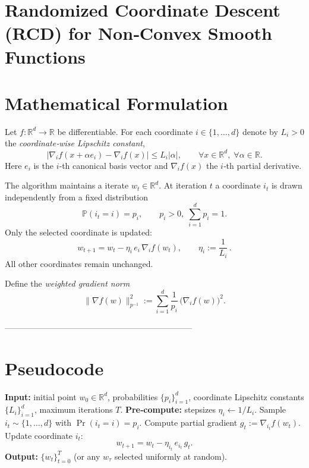 \documentclass{article}
\newcommand{\R}{\mathbb{R}}
\begin{document}
\section*{Randomized Coordinate Descent (RCD) for Non‑Convex Smooth Functions}

\section*{Mathematical Formulation}
Let $f:\R^{d}\rightarrow\R$ be differentiable.  
For each coordinate $i\in\{1,\dots,d\}$ denote by $L_i>0$ the \emph{coordinate‑wise Lipschitz constant},
\[
\big| \nabla_i f(x+ \alpha e_i)-\nabla_i f(x) \big|\le L_i|\alpha|,
\qquad\forall x\in\R^d,\;\forall\alpha\in\R .
\tag{1}
\]
Here $e_i$ is the $i$‑th canonical basis vector and $\nabla_i f(x)$ the $i$‑th partial derivative.

The algorithm maintains a iterate $w_t\in\R^d$.
At iteration $t$ a coordinate $i_t$ is drawn independently from a fixed distribution
\[
\mathbb{P}(i_t=i)=p_i,\qquad p_i>0,\;\sum_{i=1}^{d}p_i=1 .
\tag{2}
\]
Only the selected coordinate is updated:
\[
w_{t+1}=w_t-\eta_i\,e_i\,\nabla_i f(w_t),\qquad 
\eta_i:=\frac{1}{L_i}\, .
\tag{3}
\]
All other coordinates remain unchanged.  

Define the \emph{weighted gradient norm}
\[
\| \nabla f(w)\|_{p^{-1}}^2:=\sum_{i=1}^{d}\frac{1}{p_i}\,\big(\nabla_i f(w)\big)^2 .
\tag{4}
\]

--------------------------------------------------------------------

\section*{Pseudocode}
\begin{algorithm}[H]
\caption{Randomized Coordinate Descent (RCD)}
\begin{algorithmic}[1]
\State \textbf{Input:} initial point $w_0\in\R^{d}$, probabilities $\{p_i\}_{i=1}^{d}$, coordinate Lipschitz constants $\{L_i\}_{i=1}^{d}$, maximum iterations $T$.
\State \textbf{Pre‑compute:} stepsizes $\eta_i\gets 1/L_i$.
    \State Sample $i_t\sim\{1,\dots,d\}$ with $\Pr(i_t=i)=p_i$.
    \State Compute partial gradient $g_{t}:=\nabla_{i_t} f(w_t)$.
    \State Update coordinate $i_t$:
    \[
    w_{t+1}=w_t-\eta_{i_t}\,e_{i_t}\,g_{t}.
    \]
\EndFor
\State \textbf{Output:} $\{w_t\}_{t=0}^{T}$ (or any $w_{\tau}$ selected uniformly at random).
\end{algorithmic}
\end{algorithm}
\end{document}
